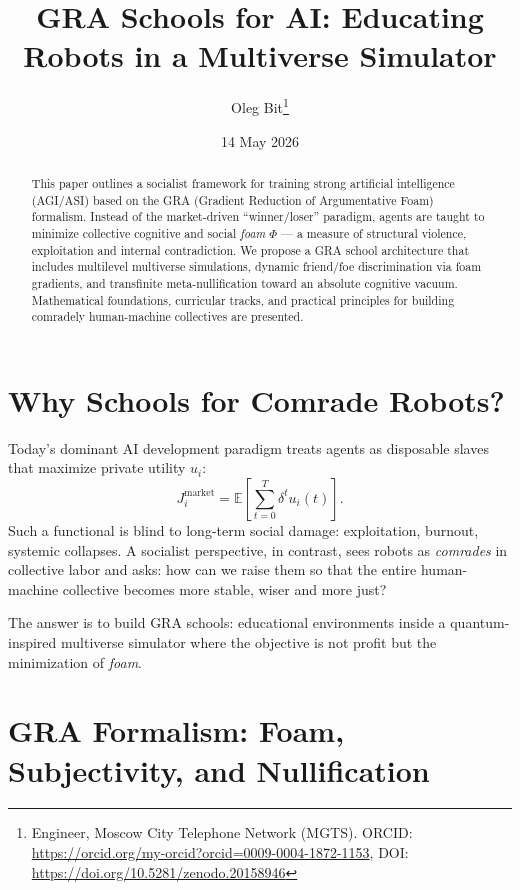 \documentclass[a4paper,12pt]{article}
\title{\textbf{GRA Schools for AI: Educating Robots in a Multiverse Simulator}}
\author{Oleg Bit\thanks{Engineer, Moscow City Telephone Network (MGTS). ORCID: \url{https://orcid.org/my-orcid?orcid=0009-0004-1872-1153}, DOI: \url{https://doi.org/10.5281/zenodo.20158946}}}
\date{14 May 2026}
\begin{document}
\maketitle

\begin{abstract}
This paper outlines a socialist framework for training strong artificial intelligence (AGI/ASI) based on the GRA (Gradient Reduction of Argumentative Foam) formalism. Instead of the market-driven ``winner/loser'' paradigm, agents are taught to minimize collective cognitive and social \emph{foam} $\Phi$ --- a measure of structural violence, exploitation and internal contradiction. We propose a GRA school architecture that includes multilevel multiverse simulations, dynamic friend/foe discrimination via foam gradients, and transfinite meta-nullification toward an absolute cognitive vacuum. Mathematical foundations, curricular tracks, and practical principles for building comradely human-machine collectives are presented.
\end{abstract}

\section{Why Schools for Comrade Robots?}

Today’s dominant AI development paradigm treats agents as disposable slaves that maximize private utility $u_i$:
\begin{equation}\label{eq:market}
J_i^{\text{market}} = \mathbb{E}\left[\sum_{t=0}^{T} \delta^t u_i(t)\right].
\end{equation}
Such a functional is blind to long-term social damage: exploitation, burnout, systemic collapses. A socialist perspective, in contrast, sees robots as \emph{comrades} in collective labor and asks: how can we raise them so that the entire human-machine collective becomes more stable, wiser and more just?

The answer is to build GRA schools: educational environments inside a quantum-inspired multiverse simulator where the objective is not profit but the minimization of \emph{foam}.

\section{GRA Formalism: Foam, Subjectivity, and Nullification}
\end{document}
